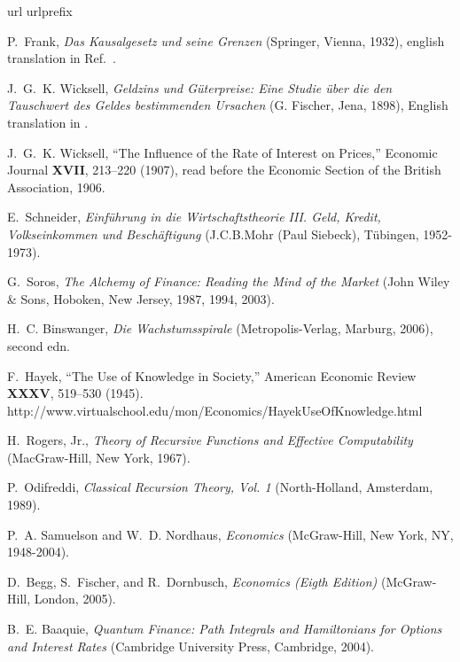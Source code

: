 \documentclass[aps,rmp,preprint,amsfonts,showpacs,showkeys]{revtex4}
\begin{document}
\begin{thebibliography}{10}
\newcommand{\enquote}[1]{``#1''}
\expandafter\ifx\csname url\endcsname\relax
  \def\url#1{{#1}}\fi
\expandafter\ifx\csname urlprefix\endcsname\relax\def\urlprefix{}\fi

P.~Frank, {\em Das Kausalgesetz und seine Grenzen\/} (Springer, Vienna, 1932),
  english translation in Ref.~\cite{franke}.

J.~G.~K. Wicksell, {\em {G}eldzins und {G}{\"{u}}terpreise: {E}ine {S}tudie
  {\"{u}}ber die den {T}auschwert des {G}eldes bestimmenden {U}rsachen\/} (G.
  Fischer, Jena, 1898), {E}nglish translation in \cite{Wicksell-geld-engl}.

J.~G.~K. Wicksell, \enquote{The Influence of the Rate of Interest on Prices,}
  Economic Journal {\bf XVII}, 213--220 (1907), read before the Economic
  Section of the British Association, 1906.

E.~Schneider, {\em {E}inf{\"{u}}hrung in die {W}irtschaftstheorie III. {G}eld,
  {K}redit, {V}olkseinkommen und {B}esch{\"{a}}ftigung\/} (J.C.B.Mohr (Paul
  Siebeck), T{\"{u}}bingen, 1952-1973).

G.~Soros, {\em The Alchemy of Finance: Reading the Mind of the Market\/} (John
  Wiley \& Sons, Hoboken, New Jersey, 1987, 1994, 2003).

H.~C. Binswanger, {\em {D}ie {W}achstumsspirale\/} (Metropolis-Verlag, Marburg,
  2006), second edn.

F.~Hayek, \enquote{The Use of Knowledge in Society,} American Economic Review
  {\bf XXXV}, 519--530 (1945).
\newline http://www.virtualschool.edu/mon/Economics/HayekUseOfKnowledge.html

H.~{Rogers, Jr.}, {\em Theory of Recursive Functions and Effective
  Computability\/} (MacGraw-Hill, New York, 1967).

P.~Odifreddi, {\em Classical Recursion Theory, Vol. 1\/} (North-Holland,
  Amsterdam, 1989).

P.~A. Samuelson and W.~D. Nordhaus, {\em Economics\/} (McGraw-Hill, New York,
  NY, 1948-2004).

D.~Begg, S.~Fischer, and R.~Dornbusch, {\em Economics (Eigth Edition)\/}
  (McGraw-Hill, London, 2005).

B.~E. Baaquie, {\em Quantum Finance: Path Integrals and Hamiltonians for
  Options and Interest Rates\/} (Cambridge University Press, Cambridge, 2004).


\end{thebibliography}
\end{document}
